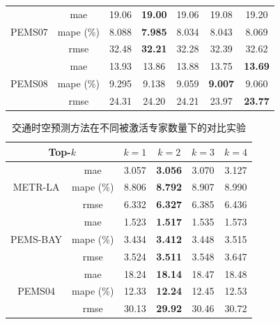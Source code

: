 \begin{table}[t!]
\begin{tabular}{cc|ccccc}
             \midrule
             \multirow{3}{*}{{PEMS07}} 
             & mae & 19.06 & \textbf{19.00} & 19.06 & 19.08 & 19.20 \\
             & mape (\%) & 8.088 & \textbf{7.985} & 8.034 & 8.043 & 8.069 \\
             & rmse & 32.48 & \textbf{32.21} & 32.28 & 32.39 & 32.62 \\

             \midrule
             \multirow{3}{*}{{PEMS08}} 
             & mae & 13.93 & 13.86 & 13.88 & 13.75 & \textbf{13.69} \\
             & mape (\%) & 9.295 & 9.138 & 9.059 & \textbf{9.007} & 9.060 \\
             & rmse & 24.31 & 24.20 & 24.21 & 23.97 & \textbf{23.77} \\

             \bottomrule
        \end{tabular}
\end{table}

\begin{table}[t!]
    \centering
    \caption{交通时空预测方法在不同被激活专家数量下的对比实验}
    \label{tab:parasen-topK}

    \begin{tabular}{cc|cccc}
            \toprule
            \multicolumn{2}{c|}{\textbf{Top-$k$}} & \textbf{$k=1$} & \textbf{$k=2$} & \textbf{$k=3$} & \textbf{$k=4$} \\
            \midrule
            \multirow{3}{*}{METR-LA} & mae & 3.057 & \textbf{3.056} & 3.070 & 3.127 \\
            & mape (\%) & 8.806 & \textbf{8.792} & 8.907 & 8.990 \\
            & rmse & 6.332 & \textbf{6.327} & 6.385 & 6.436 \\
            
            \midrule
            \multirow{3}{*}{{PEMS-BAY}} 
            & mae & 1.523 & \textbf{1.517} & 1.535 & 1.573 \\
            & mape (\%) & 3.434 & \textbf{3.412} & 3.448 & 3.515 \\
            & rmse & 3.524 & \textbf{3.511} & 3.548 & 3.647 \\

            \midrule
            \multirow{3}{*}{{PEMS04}} & mae & 18.24 & \textbf{18.14} & 18.47 & 18.48 \\
            & mape (\%) & 12.33 & \textbf{12.24} & 12.45 & 12.53 \\
            & rmse & 30.13 & \textbf{29.92} & 30.46 & 30.72 \\

            \bottomrule
    \end{tabular}
    
\end{table}


